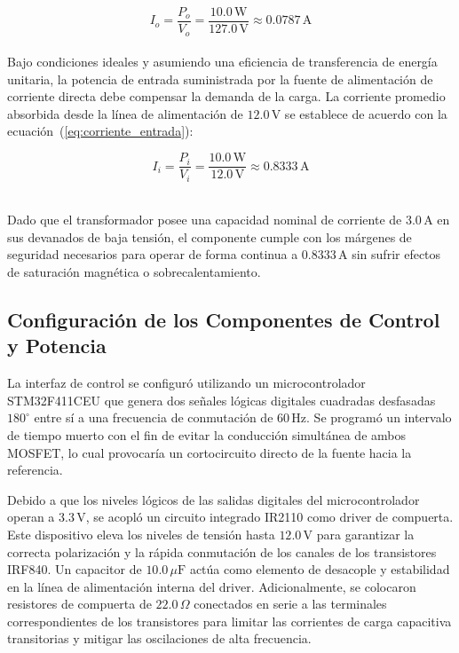 \documentclass[12pt,a4paper]{article}
\begin{document}
\begin{equation}
I_o = \frac{P_o}{V_o} = \frac{10{.}0\,\mathrm{W}}{127{.}0\,\mathrm{V}} \approx 0{.}0787\,\mathrm{A}
\label{eq:corriente_salida}
\end{equation}
\\

Bajo condiciones ideales y asumiendo una eficiencia de transferencia de energía unitaria, la potencia de entrada suministrada por la fuente de alimentación de corriente directa debe compensar la demanda de la carga. La corriente promedio absorbida desde la línea de alimentación de $12{.}0\,\mathrm{V}$ se establece de acuerdo con la ecuación~(\ref{eq:corriente_entrada}):

\begin{equation}
I_i = \frac{P_i}{V_i} = \frac{10{.}0\,\mathrm{W}}{12{.}0\,\mathrm{V}} \approx 0{.}8333\,\mathrm{A}
\label{eq:corriente_entrada}
\end{equation}

\\

Dado que el transformador posee una capacidad nominal de corriente de $3{.}0\,\mathrm{A}$ en sus devanados de baja tensión, el componente cumple con los márgenes de seguridad necesarios para operar de forma continua a $0{.}8333\,\mathrm{A}$ sin sufrir efectos de saturación magnética o sobrecalentamiento.

\subsection{Configuración de los Componentes de Control y Potencia}

La interfaz de control se configuró utilizando un microcontrolador STM32F411CEU que genera dos señales lógicas digitales cuadradas desfasadas $180^\circ$ entre sí a una frecuencia de conmutación de $60\,\mathrm{Hz}$. Se programó un intervalo de tiempo muerto con el fin de evitar la conducción simultánea de ambos MOSFET, lo cual provocaría un cortocircuito directo de la fuente hacia la referencia.

Debido a que los niveles lógicos de las salidas digitales del microcontrolador operan a $3{.}3\,\mathrm{V}$, se acopló un circuito integrado IR2110 como driver de compuerta. Este dispositivo eleva los niveles de tensión hasta $12{.}0\,\mathrm{V}$ para garantizar la correcta polarización y la rápida conmutación de los canales de los transistores IRF840. Un capacitor de $10{.}0\,\mu\mathrm{F}$ actúa como elemento de desacople y estabilidad en la línea de alimentación interna del driver. Adicionalmente, se colocaron resistores de compuerta de $22{.}0\,\Omega$ conectados en serie a las terminales correspondientes de los transistores para limitar las corrientes de carga capacitiva transitorias y mitigar las oscilaciones de alta frecuencia.
\end{document}
